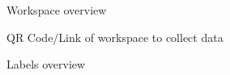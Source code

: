 \begin{figure}[!htb]
    \centering
    \caption{Workspace overview}
    \label{fig:workspace-overview}
\end{figure}

\begin{figure}[!htb]
    \centering
    \caption{QR Code/Link of workspace to collect data}
    \label{fig:workspace-link}
\end{figure}

\begin{figure}[!htb]
    \centering
    \caption{Labels overview}
    \label{fig:labels-overview}
\end{figure}

